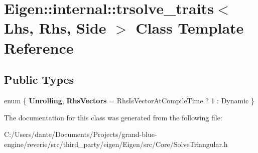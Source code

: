 \hypertarget{class_eigen_1_1internal_1_1trsolve__traits}{}\section{Eigen\+::internal\+::trsolve\+\_\+traits$<$ Lhs, Rhs, Side $>$ Class Template Reference}
\label{class_eigen_1_1internal_1_1trsolve__traits}
\subsection*{Public Types}
\begin{DoxyCompactItemize}
\item 
\mbox{\label{class_eigen_1_1internal_1_1trsolve__traits_aecdc3e3274c3b28c47b4071cb13b3e2c}} 
enum \{ {\bfseries Unrolling}, 
{\bfseries Rhs\+Vectors} = Rhs\+Is\+Vector\+At\+Compile\+Time ? 1 \+: Dynamic
 \}
\end{DoxyCompactItemize}


The documentation for this class was generated from the following file\+:\begin{DoxyCompactItemize}
\item 
C\+:/\+Users/dante/\+Documents/\+Projects/grand-\/blue-\/engine/reverie/src/third\+\_\+party/eigen/\+Eigen/src/\+Core/Solve\+Triangular.\+h\end{DoxyCompactItemize}
